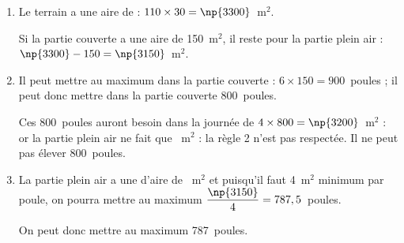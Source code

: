 
\medskip

\begin{enumerate}
\item Le terrain a une aire de : $110 \times 30 = \np{3300}$~m$^2$.

Si la partie couverte a une aire de 150~m$^2$, il reste pour  la partie \og plein air \fg{} : $\np{3300} - 150 = \np{3150}$~m$^2$.
\item Il peut mettre au maximum dans la partie couverte : $6 \times 150 = 900$~poules ; il peut donc mettre dans la partie couverte 800~poules.

Ces  800~poules auront besoin dans la journée de $4 \times 800 = \np{3200}$~m$^2$ : or la partie \og plein air \fg{} ne fait que ~m$^2$ : la règle 2 n'est pas respectée. Il ne peut pas élever 800~poules.
\item La partie \og plein air a une  d'aire de ~m$^2$ et puisqu'il faut 4~m$^2$ minimum par poule, on pourra mettre au maximum $\dfrac{\np{3150}}{4} = 787,5$~poules.

On peut donc mettre au maximum 787~poules. 

\end{enumerate}

\bigskip

